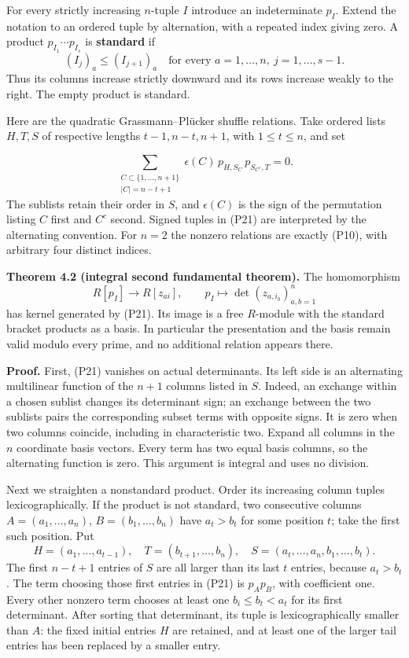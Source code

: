 \documentclass[
]{article}
\begin{document}
For every strictly increasing \(n\)-tuple \(I\) introduce an
indeterminate \(p_I\). Extend the notation to an ordered tuple by
alternation, with a repeated index giving zero. A product
\(p_{I_1}\cdots p_{I_s}\) is \textbf{standard} if \[
(I_j)_a\leq (I_{j+1})_a
\quad\text{for every }a=1,\ldots,n,\ j=1,\ldots,s-1.
\] Thus its columns increase strictly downward and its rows increase
weakly to the right. The empty product is standard.

Here are the quadratic Grassmann--Plücker shuffle relations. Take
ordered lists \(H,T,S\) of respective lengths \(t-1,n-t,n+1\), with
\(1\leq t\leq n\), and set \protect{}\label{equation-P21}{}

\[
\sum_{\substack{C\subset\{1,\ldots,n+1\}\\|C|=n-t+1}}
\epsilon(C)\,p_{H,S_C}\,p_{S_{C^c},T}=0.
\tag{P21}
\] The sublists retain their order in \(S\), and \(\epsilon(C)\) is the
sign of the permutation listing \(C\) first and \(C^c\) second. Signed
tuples in (P21) are interpreted by the alternating convention. For
\(n=2\) the nonzero relations are exactly (P10), with arbitrary four
distinct indices.

\protect{}\label{theorem-4-2}{}

\textbf{Theorem 4.2 (integral second fundamental theorem).} The
homomorphism \[
R [p_I]\longrightarrow R [z_{ai}],\qquad
p_I\longmapsto \det(z_{a,i_b})_{a,b=1}^n
\] has kernel generated by (P21). Its image is a free \(R\)-module with
the standard bracket products as a basis. In particular the presentation
and the basis remain valid modulo every prime, and no additional
relation appears there.

\textbf{Proof.} First, (P21) vanishes on actual determinants. Its left
side is an alternating multilinear function of the \(n+1\) columns
listed in \(S\). Indeed, an exchange within a chosen sublist changes its
determinant sign; an exchange between the two sublists pairs the
corresponding subset terms with opposite signs. It is zero when two
columns coincide, including in characteristic two. Expand all columns in
the \(n\) coordinate basis vectors. Every term has two equal basis
columns, so the alternating function is zero. This argument is integral
and uses no division.

Next we straighten a nonstandard product. Order its increasing column
tuples lexicographically. If the product is not standard, two
consecutive columns \(A=(a_1,\ldots,a_n)\), \(B=(b_1,\ldots,b_n)\) have
\(a_t>b_t\) for some position \(t\); take the first such position. Put
\[
H=(a_1,\ldots,a_{t-1}),\quad
T=(b_{t+1},\ldots,b_n),\quad
S=(a_t,\ldots,a_n,b_1,\ldots,b_t).
\] The first \(n-t+1\) entries of \(S\) are all larger than its last
\(t\) entries, because \(a_t>b_t\). The term choosing those first
entries in (P21) is \(p_Ap_B\), with coefficient one. Every other
nonzero term chooses at least one \(b_i\leq b_t<a_t\) for its first
determinant. After sorting that determinant, its tuple is
lexicographically smaller than \(A\): the fixed initial entries \(H\)
are retained, and at least one of the larger tail entries has been
replaced by a smaller entry.
\end{document}
